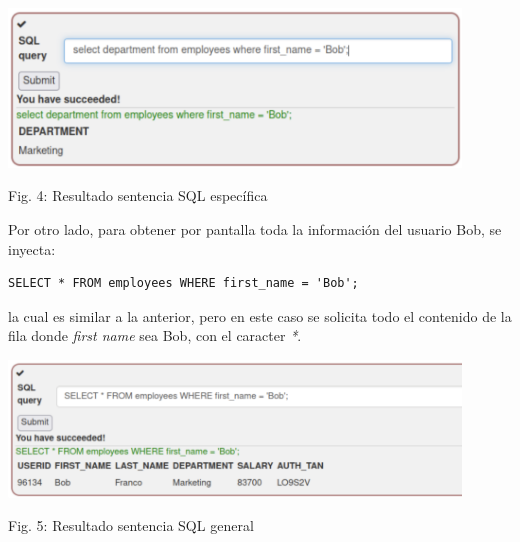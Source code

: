 \documentclass[12pt,oneside,a4paper]{book}
\begin{document}
\begin{enumerate}
\begin{enumerate}
        \newpage

        \begin{center}
            \includegraphics[width=12cm]{img/sqli1.png}
            
            \vspace{0.1em}
            
            Fig. 4: Resultado sentencia SQL específica
        \end{center}
        
        \vspace{2em}

        \hspace{20pt}
        Por otro lado, para obtener por pantalla toda la información del usuario Bob, se inyecta:

        \vspace{1em}

        \begin{verbatim}
SELECT * FROM employees WHERE first_name = 'Bob';
        \end{verbatim}

        la cual es similar a la anterior, pero en este caso se solicita todo el contenido de la fila donde \textit{first name} sea Bob, con el caracter \textit{*}.

        \vspace{2em}
        
        \begin{center}
            \includegraphics[width=12cm]{img/sqli2.png}
            
            \vspace{0.1em}
            
            Fig. 5: Resultado sentencia SQL general
        \end{center}


\end{enumerate}
\end{enumerate}
\end{document}
